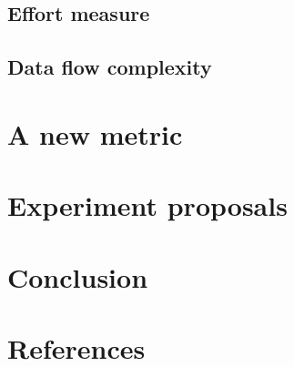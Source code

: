 \documentclass[]{article}
\begin{document}
\cite{ref:cilibrasi2005clustering}

\subsection{Effort measure}

\cite{ref:evaluating_software_complexity_measures}

\subsection{Data flow complexity}

\cite{ref:oviedo1993control}

\section{A new metric}



\section{Experiment proposals}


\section{Conclusion}
\section{References}

\printbibliography
\end{document}
